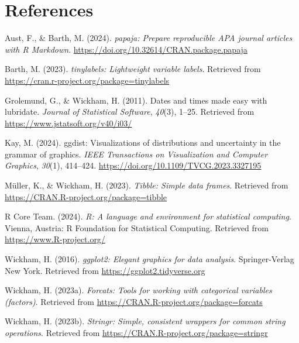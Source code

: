 \documentclass[
  man]{apa6}
\newlength{\cslhangindent}
\newenvironment{CSLReferences}[2] %
 {\begin{list}{}{%
  \setlength{\itemindent}{0pt}
  \setlength{\leftmargin}{0pt}
  \setlength{\parsep}{0pt}
  \ifodd #1
   \setlength{\leftmargin}{\cslhangindent}
   \setlength{\itemindent}{-1\cslhangindent}
  \fi
  \setlength{\itemsep}{#2\baselineskip}}}
 {\end{list}}
\begin{document}
\newpage

\section{References}\label{references}

\label{refs}
\begin{CSLReferences}{1}{0}
Aust, F., \& Barth, M. (2024). \emph{{papaja}: {Prepare} reproducible {APA} journal articles with {R Markdown}}. \url{https://doi.org/10.32614/CRAN.package.papaja}

Barth, M. (2023). \emph{{tinylabels}: Lightweight variable labels}. Retrieved from \url{https://cran.r-project.org/package=tinylabels}

Grolemund, G., \& Wickham, H. (2011). Dates and times made easy with {lubridate}. \emph{Journal of Statistical Software}, \emph{40}(3), 1--25. Retrieved from \url{https://www.jstatsoft.org/v40/i03/}

Kay, M. (2024). {ggdist}: Visualizations of distributions and uncertainty in the grammar of graphics. \emph{IEEE Transactions on Visualization and Computer Graphics}, \emph{30}(1), 414--424. \url{https://doi.org/10.1109/TVCG.2023.3327195}

Müller, K., \& Wickham, H. (2023). \emph{Tibble: Simple data frames}. Retrieved from \url{https://CRAN.R-project.org/package=tibble}

R Core Team. (2024). \emph{R: A language and environment for statistical computing}. Vienna, Austria: R Foundation for Statistical Computing. Retrieved from \url{https://www.R-project.org/}

Wickham, H. (2016). \emph{ggplot2: Elegant graphics for data analysis}. Springer-Verlag New York. Retrieved from \url{https://ggplot2.tidyverse.org}

Wickham, H. (2023a). \emph{Forcats: Tools for working with categorical variables (factors)}. Retrieved from \url{https://CRAN.R-project.org/package=forcats}

Wickham, H. (2023b). \emph{Stringr: Simple, consistent wrappers for common string operations}. Retrieved from \url{https://CRAN.R-project.org/package=stringr}


\end{CSLReferences}
\end{document}
